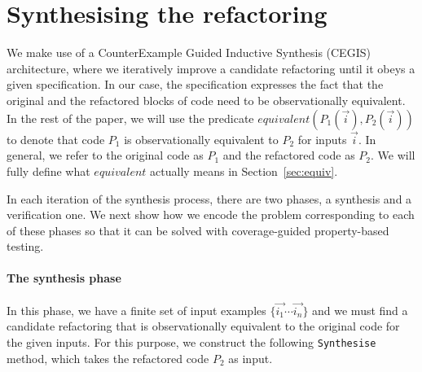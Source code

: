 \documentclass[sigconf,review,anonymous]{acmart}
\begin{document}

 
\section{Synthesising the refactoring}\label{sec:encoding}

We make use of a CounterExample Guided Inductive Synthesis (CEGIS)~\cite{DBLP:conf/pldi/Solar-LezamaJB08} architecture, where we
iteratively improve a candidate refactoring until it obeys a given specification.
In our case, the specification expresses the fact that the original and
the refactored blocks of code need to be observationally equivalent.
%
In the rest of the paper, we will use the predicate
$equivalent(P_1(\vec{i}), P_2(\vec{i}))$ to denote that code $P_1$ is
observationally equivalent to $P_2$ for inputs $\vec{i}$.  In general,
we refer to the original code as $P_1$ and the refactored code as
$P_2$. We will fully define what $equivalent$ actually means in Section~\ref{sec:equiv}.


In each iteration of the synthesis process, there are two phases, a synthesis and a verification one. We next show how we encode the problem corresponding to each of these phases so that it can be solved with coverage-guided property-based testing.

\paragraph{The synthesis phase} In this phase, we have 
a finite set of input examples $\{\vec{i_1} \cdots \vec{i_n}\}$ and we must find a candidate refactoring
that is observationally equivalent to the original code for the given inputs.
For this purpose, we construct the following \texttt{Synthesise} method, which
takes the refactored code $P_2$ as input.
\end{document}
